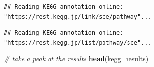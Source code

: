 \documentclass[
]{book}
\newenvironment{Shaded}{\begin{snugshade}}{\end{snugshade}}
\newcommand{\AttributeTok}[1]{\textcolor[rgb]{0.13,0.29,0.53}{#1}}
\newcommand{\CommentTok}[1]{\textcolor[rgb]{0.56,0.35,0.01}{\textit{#1}}}
\newcommand{\FunctionTok}[1]{\textcolor[rgb]{0.13,0.29,0.53}{\textbf{#1}}}
\newcommand{\NormalTok}[1]{#1}
\newcommand{\OtherTok}[1]{\textcolor[rgb]{0.56,0.35,0.01}{#1}}
\newcommand{\StringTok}[1]{\textcolor[rgb]{0.31,0.60,0.02}{#1}}
\begin{document}
\begin{Shaded}
\end{Shaded}

\begin{verbatim}
## Reading KEGG annotation online: "https://rest.kegg.jp/link/sce/pathway"...
\end{verbatim}

\begin{verbatim}
## Reading KEGG annotation online: "https://rest.kegg.jp/list/pathway/sce"...
\end{verbatim}

\begin{Shaded}
\begin{Highlighting}[]
\CommentTok{\# take a peak at the results}
\FunctionTok{head}\NormalTok{(kegg\_results)}
\end{Highlighting}
\end{Shaded}
\end{document}
